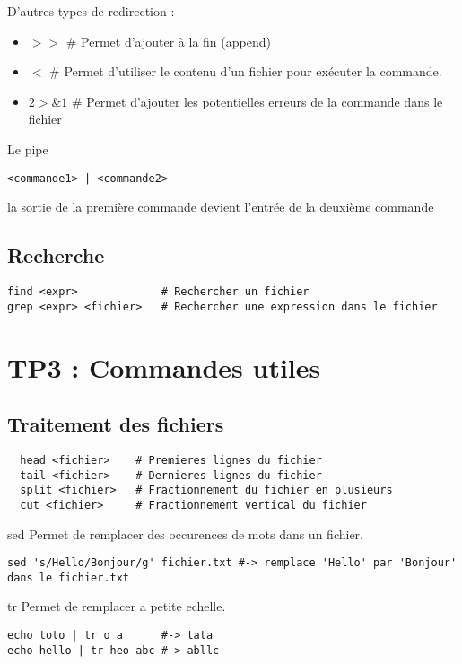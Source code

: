\documentclass{article}
\begin{document}
D'autres types de redirection :

\begin{itemize}
  \item $>>$    \# Permet d'ajouter à la fin (append)
  \item $<$    \# Permet d'utiliser le contenu d'un fichier pour exécuter la commande.
  \item $2>\&1$ \# Permet d'ajouter les potentielles erreurs de la commande dans le fichier
\end{itemize}

Le pipe 
\begin{lstlisting}
<commande1> | <commande2>
\end{lstlisting}
 la sortie de la première commande devient l'entrée de la deuxième commande

\subsection{Recherche}
\begin{lstlisting}
find <expr>             # Rechercher un fichier
grep <expr> <fichier>   # Rechercher une expression dans le fichier
\end{lstlisting}

\section{TP3 : Commandes utiles}

\subsection{Traitement des fichiers}
\begin{lstlisting}
  head <fichier>    # Premieres lignes du fichier
  tail <fichier>    # Dernieres lignes du fichier
  split <fichier>   # Fractionnement du fichier en plusieurs
  cut <fichier>     # Fractionnement vertical du fichier  
\end{lstlisting}

sed
Permet de remplacer des occurences de mots dans un fichier.
\begin{lstlisting}
sed 's/Hello/Bonjour/g' fichier.txt #-> remplace 'Hello' par 'Bonjour' dans le fichier.txt
\end{lstlisting}

tr
Permet de remplacer a petite echelle.

\begin{lstlisting}
echo toto | tr o a      #-> tata
echo hello | tr heo abc #-> abllc
\end{lstlisting}
\end{document}
